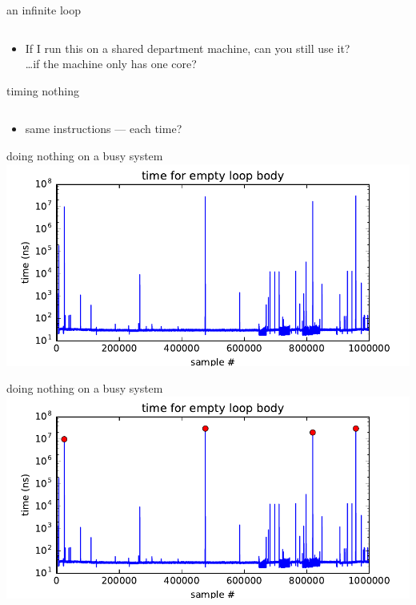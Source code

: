 \begin{frame}{an infinite loop}
\inputminted{C}{../kernel/loop.c}
\begin{itemize}
\item If I run this on a shared department machine, can you still use it? \\
\ldots if the machine only has one core?
\end{itemize}
\end{frame}

\begin{frame}{timing nothing}
\inputminted[firstline=18]{C}{../kernel/timedloop.c}
\begin{itemize}
\item same instructions ---  each time?
\end{itemize}
\end{frame}

\begin{frame}{doing nothing on a busy system}
\includegraphics[width=\textwidth]{../kernel/empty-samples}
\end{frame}

\begin{frame}{doing nothing on a busy system}
\includegraphics[width=\textwidth]{../kernel/empty-samples-big-marked}
\end{frame}

